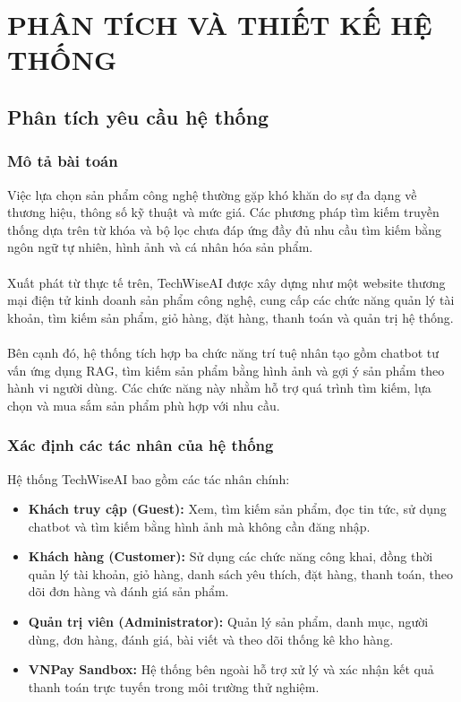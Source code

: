 \documentclass{report}
\begin{document}
\chapter{PHÂN TÍCH VÀ THIẾT KẾ HỆ THỐNG}
\section{Phân tích yêu cầu hệ thống}
\subsection{Mô tả bài toán}
Việc lựa chọn sản phẩm công nghệ thường gặp khó khăn do sự đa dạng về thương hiệu, thông số kỹ thuật và mức giá. Các phương pháp tìm kiếm truyền thống dựa trên từ khóa và bộ lọc chưa đáp ứng đầy đủ nhu cầu tìm kiếm bằng ngôn ngữ tự nhiên, hình ảnh và cá nhân hóa sản phẩm.\\\\
Xuất phát từ thực tế trên, TechWiseAI được xây dựng như một website thương mại điện tử kinh doanh sản phẩm công nghệ, cung cấp các chức năng quản lý tài khoản, tìm kiếm sản phẩm, giỏ hàng, đặt hàng, thanh toán và quản trị hệ thống.\\\\
Bên cạnh đó, hệ thống tích hợp ba chức năng trí tuệ nhân tạo gồm chatbot tư vấn ứng dụng RAG, tìm kiếm sản phẩm bằng hình ảnh và gợi ý sản phẩm theo hành vi người dùng. Các chức năng này nhằm hỗ trợ quá trình tìm kiếm, lựa chọn và mua sắm sản phẩm phù hợp với nhu cầu.

\subsection{Xác định các tác nhân của hệ thống}
Hệ thống TechWiseAI bao gồm các tác nhân chính:
\begin{itemize}
    \item \textbf{Khách truy cập (Guest):} Xem, tìm kiếm sản phẩm, đọc tin tức, sử dụng chatbot và tìm kiếm bằng hình ảnh mà không cần đăng nhập.
    \item \textbf{Khách hàng (Customer):} Sử dụng các chức năng công khai, đồng thời quản lý tài khoản, giỏ hàng, danh sách yêu thích, đặt hàng, thanh toán, theo dõi đơn hàng và đánh giá sản phẩm.
    \item \textbf{Quản trị viên (Administrator):} Quản lý sản phẩm, danh mục, người dùng, đơn hàng, đánh giá, bài viết và theo dõi thống kê kho hàng.
    \item \textbf{VNPay Sandbox:} Hệ thống bên ngoài hỗ trợ xử lý và xác nhận kết quả thanh toán trực tuyến trong môi trường thử nghiệm.
\end{itemize}
\end{document}
